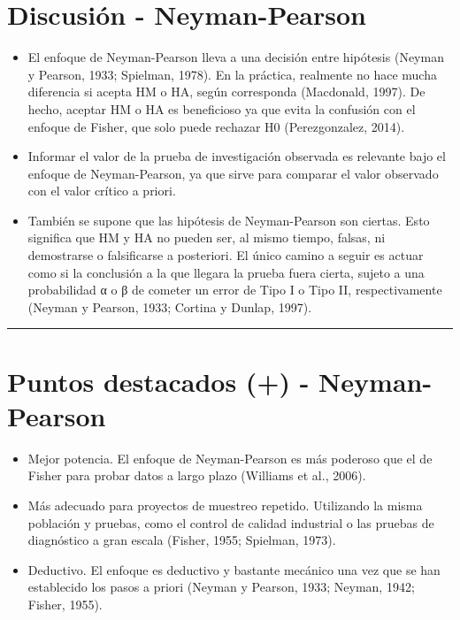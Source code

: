\documentclass[
]{article}
\begin{document}
\hypertarget{discusiuxf3n---neyman-pearson}{%
\section{Discusión -
Neyman-Pearson}\label{discusiuxf3n---neyman-pearson}}

\begin{itemize}
\item
  El enfoque de Neyman-Pearson lleva a una decisión entre hipótesis
  (Neyman y Pearson, 1933; Spielman, 1978). En la práctica, realmente no
  hace mucha diferencia si acepta HM o HA, según corresponda (Macdonald,
  1997). De hecho, aceptar HM o HA es beneficioso ya que evita la
  confusión con el enfoque de Fisher, que solo puede rechazar H0
  (Perezgonzalez, 2014).
\item
  Informar el valor de la prueba de investigación observada es relevante
  bajo el enfoque de Neyman-Pearson, ya que sirve para comparar el valor
  observado con el valor crítico a priori.
\item
  También se supone que las hipótesis de Neyman-Pearson son ciertas.
  Esto significa que HM y HA no pueden ser, al mismo tiempo, falsas, ni
  demostrarse o falsificarse a posteriori. El único camino a seguir es
  actuar como si la conclusión a la que llegara la prueba fuera cierta,
  sujeto a una probabilidad α o β de cometer un error de Tipo I o Tipo
  II, respectivamente (Neyman y Pearson, 1933; Cortina y Dunlap, 1997).
\end{itemize}

\begin{center}\rule{0.5\linewidth}{0.5pt}\end{center}

\hypertarget{puntos-destacados---neyman-pearson}{%
\section{Puntos destacados (+) -
Neyman-Pearson}\label{puntos-destacados---neyman-pearson}}

\begin{itemize}
\item
  Mejor potencia. El enfoque de Neyman-Pearson es más poderoso que el de
  Fisher para probar datos a largo plazo (Williams et al., 2006).
\item
  Más adecuado para proyectos de muestreo repetido. Utilizando la misma
  población y pruebas, como el control de calidad industrial o las
  pruebas de diagnóstico a gran escala (Fisher, 1955; Spielman, 1973).
\item
  Deductivo. El enfoque es deductivo y bastante mecánico una vez que se
  han establecido los pasos a priori (Neyman y Pearson, 1933; Neyman,
  1942; Fisher, 1955).
\end{itemize}
\end{document}
